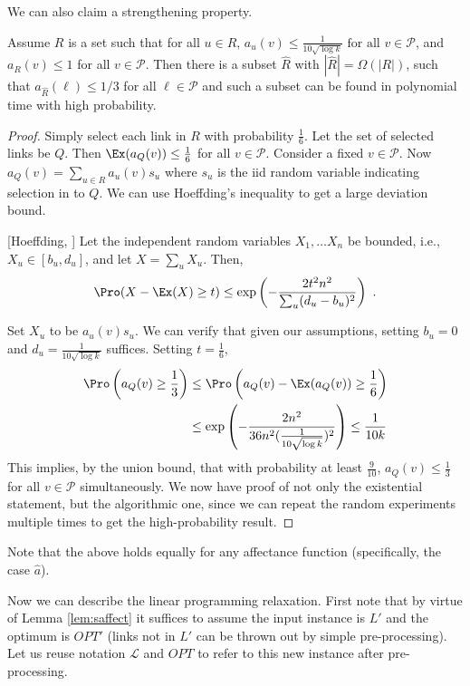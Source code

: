 \documentclass[11pt]{amsart}
\def\calL{{\mathcal L}}
\def\calP{{\mathcal P}}
\begin{document}
We can also claim a strengthening property.
\begin{lemma}
Assume $R$ is a set such that for all $u \in R$, $a_u(v) \leq
\frac{1}{10 \sqrt{\log k}} \text { for all } v \in \calP$, and $a_R(v)
\leq 1$ for all $v \in \calP$. Then there is a subset $\hat R$
with $|\hat{R}| = \Omega(|R|)$,
such that $a_{\hat R}(\ell) \leq 1/3$ for all $\ell \in \calP$ and such a subset can be found in polynomial time with high probability.
\label{lem:sparsify1}
\end{lemma}
\begin{proof}
Simply select each link in $R$ with probability $\frac{1}{6}$. Let the set of selected links be $Q$. Then
$\Ex(a_Q(v)) \leq \frac{1}{6}$ for all $v \in \calP$. Consider a fixed $v \in \calP$. Now
$a_Q(v) = \sum_{u \in R} a_u(v) s_u$ where $s_u$ is the iid random variable indicating selection in to $Q$.
We can use Hoeffding's inequality to get a large deviation bound.

\begin{theorem}{[Hoeffding, \cite{hoeffding1963}]}
Let the independent random variables $X_1, \ldots X_n$ be bounded, i.e., $X_u \in [b_u, d_u]$, and let $X = \sum_u X_u$. Then,
$$\Pro(X - \Ex(X) \geq t) \leq \exp\left(-\frac{2 t^2 n^2}{ \sum_u (d_u - b_u)^2}\right)\ .$$
\end{theorem}

Set $X_u$ to be $a_u(v) s_u$. We can verify that given our assumptions, setting $b_u = 0$ and $d_u = \frac{1}{10 \sqrt{\log k}}$ suffices. Setting $t = \frac{1}{6}$,
\begin{align*}
 \Pro\left(a_Q(v) \geq \frac{1}{3}\right) & \leq \Pro\left(a_Q(v) - \Ex(a_Q(v)) \geq \frac{1}{6}\right) \\ 
&\leq  \exp\left(-\frac{2  n^2}{36 n^2 (\frac{1}{10 \sqrt{\log k}})^2}\right) \leq \frac{1}{10 k}
\end{align*}
This implies, by the union bound, that with probability at least $\frac{9}{10}$, $a_Q(v) \leq \frac{1}{3}$ for all $v \in \calP$ simultaneously. We now have proof of not only the existential statement, but the algorithmic one, since we can repeat the random experiments multiple times to get the high-probability result. 
\end{proof}
Note that the above holds equally for any affectance function (specifically, the case $\hat a$).

Now we can describe the linear programming relaxation. First note that by virtue of Lemma \ref{lem:saffect} it suffices to  assume the input instance is $L'$ and the optimum is $OPT'$ (links not in $L'$ can be thrown out by simple pre-processing). 
Let us reuse notation $\calL$ and $OPT$ to refer to this new instance after pre-processing.
\end{document}
